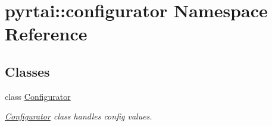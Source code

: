 \hypertarget{namespacepyrtai_1_1configurator}{
\section{pyrtai\-:\-:configurator \-Namespace \-Reference}
\label{namespacepyrtai_1_1configurator}
}
\subsection*{\-Classes}
\begin{DoxyCompactItemize}
\item 
class \hyperlink{classpyrtai_1_1configurator_1_1_configurator}{\-Configurator}
\begin{DoxyCompactList}\small\item\em \hyperlink{classpyrtai_1_1configurator_1_1_configurator}{\-Configurator} class handles config values. \end{DoxyCompactList}\end{DoxyCompactItemize}
